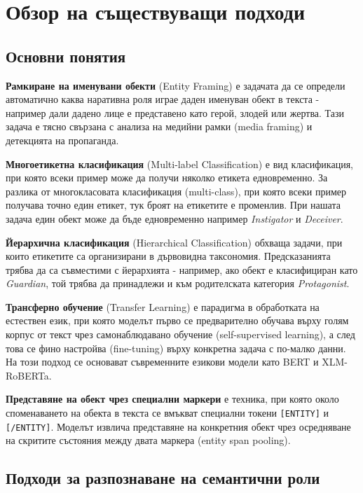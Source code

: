 \documentclass[12pt,a4paper]{report}
\begin{document}
\chapter{Обзор на съществуващи подходи}

\section{Основни понятия}

\textbf{Рамкиране на именувани обекти} (Entity Framing) е задачата да се определи автоматично каква наративна роля играе даден именуван обект в текста - например дали дадено лице е представено като герой, злодей или жертва. Тази задача е тясно свързана с анализа на медийни рамки (media framing) и детекцията на пропаганда.

\textbf{Многоетикетна класификация} (Multi-label Classification) е вид класификация, при която всеки пример може да получи няколко етикета едновременно. За разлика от многокласовата класификация (multi-class), при която всеки пример получава точно един етикет, тук броят на етикетите е променлив. При нашата задача един обект може да бъде едновременно например \textit{Instigator} и \textit{Deceiver}.

\textbf{Йерархична класификация} (Hierarchical Classification) обхваща задачи, при които етикетите са организирани в дървовидна таксономия. Предсказанията трябва да са съвместими с йерархията - например, ако обект е класифициран като \textit{Guardian}, той трябва да принадлежи и към родителската категория \textit{Protagonist}.

\textbf{Трансферно обучение} (Transfer Learning) е парадигма в обработката на естествен език, при която моделът първо се предварително обучава върху голям корпус от текст чрез самонаблюдавано обучение (self-supervised learning), а след това се фино настройва (fine-tuning) върху конкретна задача с по-малко данни. На този подход се основават съвременните езикови модели като BERT и XLM-RoBERTa.

\textbf{Представяне на обект чрез специални маркери} е техника, при която около споменаването на обекта в текста се вмъкват специални токени \texttt{[ENTITY]} и \texttt{[/ENTITY]}. Моделът извлича представяне на конкретния обект чрез осредняване на скритите състояния между двата маркера (entity span pooling).


\section{Подходи за разпознаване на семантични роли}
\end{document}
